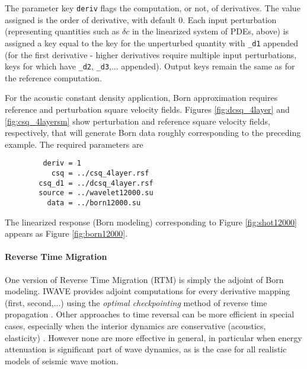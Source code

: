 The parameter key {\tt deriv} flags the computation, or not, of
derivatives. The value assigned is the order of derivative, with
default 0. Each input perturbation (representing quantities such as
$\delta c$ in the linearized system of PDEs, above) is assigned a key
equal to the key for the unperturbed quantity with {\tt \_d1} appended
(for the first derivative - higher derivatives require multiple input
perturbations, keys for which have {\tt \_d2},
{\tt \_d3},... appended). Output keys remain the same as for the reference
computation. 

For the acoustic constant density application, Born approximation
requires reference and perturbation square velocity fields. Figures
\ref{fig:dcsq_4layer} and \ref{fig:csq_4layersm} show perturbation and
reference square velocity fields, respectively, that will generate
Born data roughly corresponding to the preceding example. The required
parameters are
\begin{verbatim}
         deriv = 1
           csq = ../csq_4layer.rsf
        csq_d1 = ../dcsq_4layer.rsf
        source = ../wavelet12000.su
          data = ../born12000.su
\end{verbatim}
The linearized response (Born modeling) corresponding to Figure 
\ref{fig:shot12000} appears as Figure \ref{fig:born12000}.


\noindent \paragraph{Reverse Time Migration}
One version of Reverse Time Migration (RTM) is simply the adjoint of
Born modeling. IWAVE provides adjoint computations for every
derivative mapping (first, second,...) using the {\em optimal
  checkpointing} method of reverse time propagation
\cite[]{Griewank:book,BlanVerSy:95,Plessix:06,Symes:06a-pub}. Other approaches to time reversal can be more efficient in
special cases, especially when the interior dynamics are conservative
(acoustics, elasticity) \cite[]{Dussaud:08,Clapp:09}. However
none are more effective in general, in particular when energy
attenuation is significant part of wave dynamics, as is the case for
all realistic models of seismic wave motion. 

